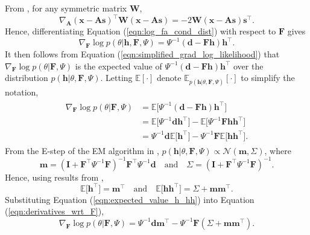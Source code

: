 \documentclass[msc,deptreport.inf]{infthesis} %
\newcommand{\matr}[1]{\mathbf{#1}}
\newcommand{\E}{\mathbb E}
\begin{document}
From \cite{petersen2012}, for any symmetric matrix $\matr{W}$,
\begin{equation}
	\nabla_{\matr{A}} (\matr{x} - \matr{As})^\intercal \matr{W} (\matr{x} - \matr{As}) = -2 \matr{W} (\matr{x} - \matr{As}) \matr{s}^\intercal.
\end{equation}
Hence, differentiating Equation (\ref{eqn:log_fa_cond_dist}) with respect to $\matr{F}$ gives
\begin{equation}
	\nabla_{\matr{F}} \log p(\theta | \matr{h}, \matr{F}, \Psi)
	= \Psi^{-1} (\matr{d} - \matr{Fh}) \matr{h}^\intercal.
\end{equation}
It then follows from Equation (\ref{eqn:simplified_grad_log_likelihood}) that $\nabla_{\matr{F}} \log p(\theta | \matr{F}, \Psi)$ is the expected value of $\Psi^{-1} (\matr{d} - \matr{Fh}) \matr{h}^\intercal$ over the distribution $p(\matr{h} | \theta, \matr{F}, \Psi)$. Letting $\E[\cdot]$ denote $\E_{p(\matr{h} | \theta, \matr{F}, \Psi)}[\cdot]$ to simplify the notation, 
\begin{align}\label{eqn:derivatives_wrt_F}
\begin{split}
	\nabla_{\matr{F}} \log p(\theta | \matr{F}, \Psi) 
	& = \E \big[ \Psi^{-1} (\matr{d} - \matr{Fh}) \matr{h}^\intercal \big] \\
	& = \E \big[ \Psi^{-1} \matr{d} \matr{h}^\intercal \big] 
	- \E \big[ \Psi^{-1} \matr{Fh} \matr{h}^\intercal \big] \\
	& = \Psi^{-1} \matr{d} \E \big[ \matr{h}^\intercal \big] 
	- \Psi^{-1} \matr{F}  \E \big[ \matr{h} \matr{h}^\intercal \big].
\end{split}
\end{align} 
From the E-step of the EM algorithm in \cite{barber2007}, $p(\matr{h} | \theta, \matr{F}, \Psi) \propto \mathcal{N}(\matr{m}, \Sigma)$, where
\begin{equation}\label{eqn:variational_params}
	\matr{m} = (\matr{I} + \matr{F}^\intercal \Psi^{-1} \matr{F})^{-1} \matr{F}^\intercal \Psi^{-1} \matr{d}
	\quad \text{and} \quad \Sigma = (\matr{I} + \matr{F}^\intercal \Psi^{-1} \matr{F})^{-1}.
\end{equation}
Hence, using results from \cite{petersen2012}, 
\begin{equation}\label{eqn:expected_value_h_hh}
	\E \big[ \matr{h}^\intercal \big] = \matr{m}^\intercal \quad \text{and} \quad \E \big[ \matr{h} \matr{h}^\intercal \big] = \Sigma + \matr{m} \matr{m}^\intercal.
\end{equation}
Substituting Equation (\ref{eqn:expected_value_h_hh}) into Equation (\ref{eqn:derivatives_wrt_F}), 
\begin{equation}
	\nabla_{\matr{F}} \log p(\theta | \matr{F}, \Psi) 
	= \Psi^{-1} \matr{d} \matr{m}^\intercal
	- \Psi^{-1} \matr{F}  (\Sigma + \matr{m} \matr{m}^\intercal).
\end{equation}
\end{document}
